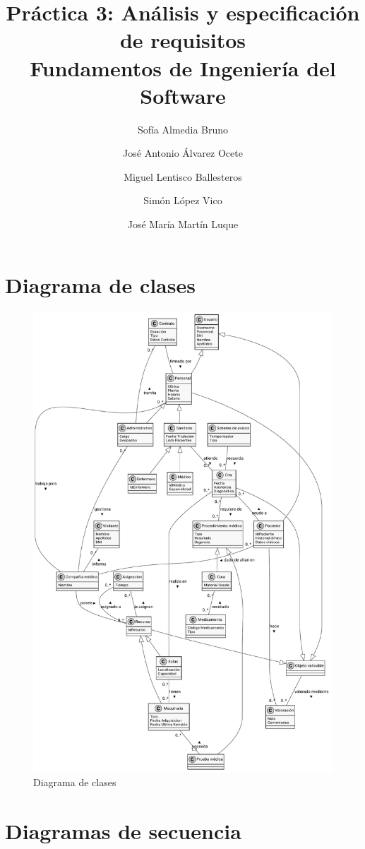 \documentclass[11pt,a4paper]{article}
\title{Práctica 3: Análisis y especificación de requisitos \large\\ Fundamentos de Ingeniería del Software}
\author{Sofía Almedia Bruno \and José Antonio Álvarez Ocete \and Miguel Lentisco Ballesteros \and Simón López Vico \and José María Martín Luque}
\begin{document}
\maketitle

\section{Diagrama de clases}

\begin{figure}[H]
	\caption{Diagrama de clases}
	\centering
  \includegraphics[width=\textwidth,height=\textheight,keepaspectratio]{diagramas/pdf/diagramaClases.pdf}
\end{figure}

\section{Diagramas de secuencia}
\end{document}
